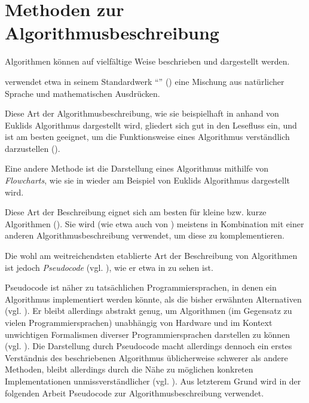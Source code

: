 \section{Methoden zur Algorithmusbeschreibung}
\label{sec:algorithm-specification-overview}

Algorithmen können auf vielfältige Weise beschrieben und dargestellt werden.

\citeauthor{taocp1} verwendet etwa in seinem Standardwerk \enquote{} (\cite{taocp1}) eine Mischung aus natürlicher Sprache und mathematischen Ausdrücken. 



Diese Art der Algorithmusbeschreibung, wie sie beispielhaft in  anhand von Euklids Algorithmus dargestellt wird, gliedert sich gut in den Lesefluss ein, und ist am besten geeignet, um die Funktionsweise eines Algorithmus verständlich darzustellen (\cite[147]{zob2015}).

Eine andere Methode ist die Darstellung eines Algorithmus mithilfe von \emph{Flowcharts}, wie sie in  wieder am Beispiel von Euklids Algorithmus dargestellt wird.



Diese Art der Beschreibung eignet sich am besten für kleine bzw. kurze Algorithmen (\cite[5]{hsr1997}). Sie wird (wie etwa auch von \citeauthor{taocp1}) meistens in Kombination mit einer anderen Algorithmusbeschreibung verwendet, um diese zu komplementieren.

Die wohl am weitreichendsten etablierte Art der Beschreibung von Algorithmen ist jedoch \emph{Pseudocode} (vgl. \cite[147]{zob2015}), wie er etwa in  zu sehen ist.



Pseudocode ist näher zu tatsächlichen Programmiersprachen, in denen ein Algorithmus implementiert werden könnte, als die bisher erwähnten Alternativen (vgl. \cite[1]{ofn2015}). Er bleibt allerdings abstrakt genug, um Algorithmen (im Gegensatz zu vielen Programmiersprachen) unabhängig von Hardware und im Kontext unwichtigen Formalismen diverser Programmiersprachen darstellen zu können (vgl. \cite[1]{bem1958}). Die Darstellung durch Pseudocode macht allerdings dennoch ein erstes Verständnis des beschriebenen Algorithmus üblicherweise schwerer als andere Methoden, bleibt allerdings durch die Nähe zu möglichen konkreten Implementationen unmissverständlicher (vgl. \cite[147]{zob2015}). Aus letzterem Grund wird in der folgenden Arbeit Pseudocode zur Algorithmusbeschreibung verwendet.

